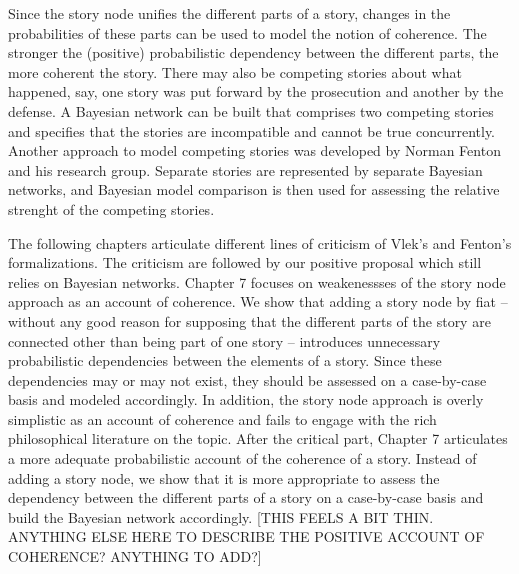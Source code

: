 \documentclass[10pt,dvipsnames,enabledeprecatedfontcommands]{scrartcl}
\begin{document}
Since the story node unifies the different parts of a story, changes in
the probabilities of these parts can be used to model the notion of
coherence. The stronger the (positive) probabilistic dependency between
the different parts, the more coherent the story. There may also be
competing stories about what happened, say, one story was put forward by
the prosecution and another by the defense. A Bayesian network can be
built that comprises two competing stories and specifies that the
stories are incompatible and cannot be true concurrently. Another
approach to model competing stories was developed by Norman Fenton and
his research group. Separate stories are represented by separate
Bayesian networks, and Bayesian model comparison is then used for
assessing the relative strenght of the competing stories.

The following chapters articulate different lines of criticism of Vlek's
and Fenton's formalizations. The criticism are followed by our positive
proposal which still relies on Bayesian networks. Chapter 7 focuses on
weakenessses of the story node approach as an account of coherence. We
show that adding a story node by fiat -- without any good reason for
supposing that the different parts of the story are connected other than
being part of one story -- introduces unnecessary probabilistic
dependencies between the elements of a story. Since these dependencies
may or may not exist, they should be assessed on a case-by-case basis
and modeled accordingly. In addition, the story node approach is overly
simplistic as an account of coherence and fails to engage with the rich
philosophical literature on the topic. After the critical part, Chapter
7 articulates a more adequate probabilistic account of the coherence of
a story. Instead of adding a story node, we show that it is more
appropriate to assess the dependency between the different parts of a
story on a case-by-case basis and build the Bayesian network
accordingly. {[}THIS FEELS A BIT THIN. ANYTHING ELSE HERE TO DESCRIBE
THE POSITIVE ACCOUNT OF COHERENCE? ANYTHING TO ADD?{]}
\end{document}
